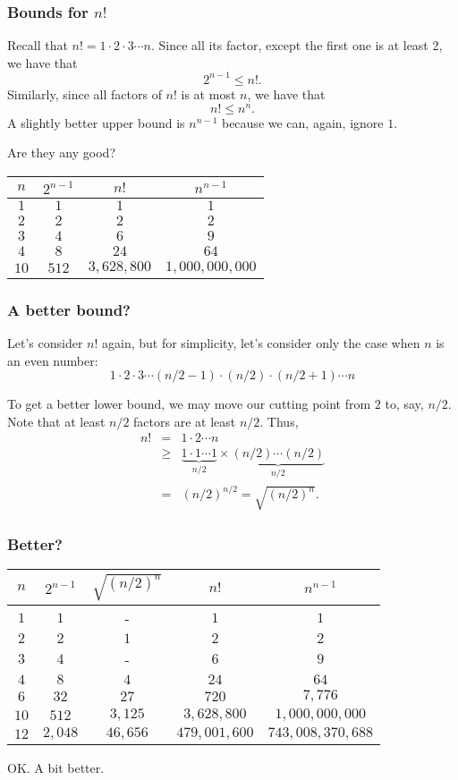\begin{frame}\frametitle{Bounds for $n!$}
  Recall that $n!=1\cdot 2\cdot 3\cdots n$.  Since all its factor,
  except the first one is at least 2, we have that
  \[ 2^{n-1}\leq n!. \] \pause
  Similarly, since all factors of $n!$ is at most $n$, we have that
  \[ n! \leq n^n.\] \pause
  A slightly better upper bound is $n^{n-1}$ because we can, again,
  ignore $1$.
  \pause

  \vspace{0.1in}
  Are they any good? \pause

  {\small
  \begin{tabular}{c|c|c|c}
    $n$ & $2^{n-1}$ & $n!$ & $n^{n-1}$ \\ \hline
    $1$ & $1$ & $1$ & $1$ \\
    $2$ & $2$ & $2$ & $2$ \\
    $3$ & $4$ & $6$ & $9$ \\
    $4$ & $8$ & $24$ & $64$ \\
    $10$ & $512$ & $3,628,800$ & $1,000,000,000$
  \end{tabular}
  }
\end{frame}

\begin{frame}\frametitle{A better bound?}
  Let's consider $n!$ again, but for simplicity, let's consider only
  the case when $n$ is an even number:
  \[ 1\cdot 2\cdot 3\cdots (n/2-1)\cdot(n/2)\cdot (n/2+1)\cdots n \]
  \pause

  To get a better lower bound, we may move our cutting point from $2$
  to, say, $n/2$.  Note that at least $n/2$ factors are at least
  $n/2$.  Thus,
  \begin{eqnarray*}
    n! &=& 1\cdot 2\cdots n \\
    &\geq& \underbrace{1\cdot 1\cdots 1}_{n/2}\times\underbrace{(n/2)\cdots(n/2)}_{n/2} \\
    &=& (n/2)^{n/2} = \sqrt{(n/2)^n}.
  \end{eqnarray*}
\end{frame}

\begin{frame}\frametitle{Better?}
  \begin{tabular}{c|c|c|c|c}
    $n$ & $2^{n-1}$ & $\sqrt{(n/2)^n}$ & $n!$ & $n^{n-1}$ \\ \hline
    $1$ & $1$ & - & $1$ & $1$ \\
    $2$ & $2$ & $1$ & $2$ & $2$ \\
    $3$ & $4$ & - & $6$ & $9$ \\
    $4$ & $8$ & $4$ & $24$ & $64$ \\
    $6$ & $32$ & $27$ & $720$ & $7,776$ \\
    $10$ & $512$ & $3,125$ & $3,628,800$ & $1,000,000,000$ \\
    $12$ & $2,048$ & $46,656$ & $479,001,600$ & $743,008,370,688$
  \end{tabular}

  \vspace{0.2in}

  OK. A bit better.
\end{frame}

